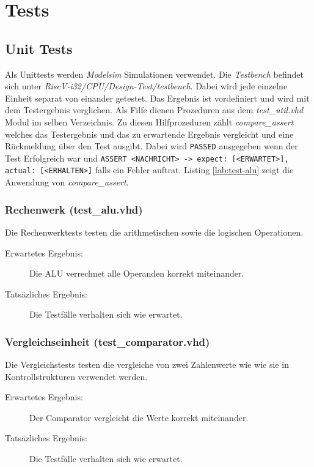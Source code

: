 \chapter{Tests}

    \section{Unit Tests}
        Als Unittests werden \textit{Modelsim} Simulationen verwendet.
        Die \textit{Testbench} befindet sich unter
        \textit{RiscV-i32/CPU/Design-Test/testbench}.
        Dabei wird jede einzelne Einheit separat von einander getestet.
        Das Ergebnis ist vordefiniert und wird mit dem Testergebnis verglichen.
        Als Filfe dienen Prozeduren aus dem \textit{test\_util.vhd} Modul im
        selben Verzeichnis. Zu diesen Hilfprozeduren zählt
        \textit{compare\_assert} welches das Testergebnis und das zu erwartende Ergebnis
        vergleicht und eine Rückmeldung über den Test ausgibt. Dabei wird
        \texttt{PASSED} ausgegeben wenn der Test Erfolgreich war und
        \texttt{ASSERT <NACHRICHT> -> expect: [<ERWARTET>], actual: [<ERHALTEN>]}
        falls ein Fehler auftrat. Listing \ref{lab:test-alu} zeigt die Anwendung
        von \textit{compare\_assert}.
        


        \subsection{Rechenwerk (test\_alu.vhd)}
            Die Rechenwerktests testen die arithmetischen sowie die logischen 
            Operationen.
            \begin{description}
                \item[Erwartetes Ergebnis:] Die ALU verrechnet alle Operanden korrekt miteinander.
                \item[Tatsäzliches Ergebnis:] Die Testfälle verhalten sich wie erwartet.
            \end{description}

        \subsection{Vergleichseinheit (test\_comparator.vhd)}
            Die Vergleichstests testen die vergleiche von zwei Zahlenwerte wie
            wie sie in Kontrollstrukturen verwendet werden.
            \begin{description}
                \item[Erwartetes Ergebnis:] Der Comparator vergleicht die Werte
                korrekt miteinander. 
                \item[Tatsäzliches Ergebnis:] Die Testfälle verhalten sich wie erwartet.
            \end{description}


